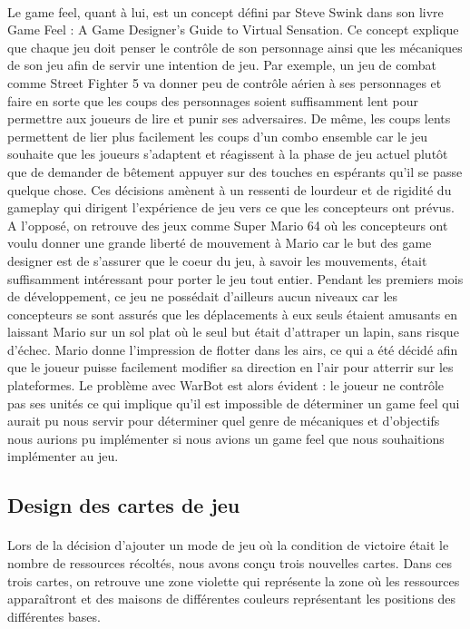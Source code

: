 \documentclass{report}
\begin{document}
\paragraph{}


  Le game feel, quant à lui, est un concept défini par Steve Swink dans son livre Game Feel : A Game Designer’s Guide to Virtual Sensation. Ce concept explique que chaque jeu doit penser le contrôle de son personnage ainsi que les mécaniques de son jeu afin de servir une intention de jeu. Par exemple, un jeu de combat comme Street Fighter 5 va donner peu de contrôle aérien à ses personnages et faire en sorte que les coups des personnages soient suffisamment lent pour permettre aux joueurs de lire et punir ses adversaires. De même, les coups lents permettent de lier plus facilement les coups d’un combo ensemble car le jeu souhaite que les joueurs s’adaptent et réagissent à la phase de jeu actuel plutôt que de demander de bêtement appuyer sur des touches en espérants qu’il se passe quelque chose. Ces décisions amènent à un ressenti de lourdeur et de rigidité du gameplay qui dirigent l’expérience de jeu vers ce que les concepteurs ont prévus. \newline
A l’opposé, on retrouve des jeux comme Super Mario 64 où les concepteurs ont voulu donner une grande liberté de mouvement à Mario car le but des game designer est de s’assurer que le coeur du jeu, à savoir les mouvements, était suffisamment intéressant pour porter le jeu tout entier. Pendant les premiers mois de développement, ce jeu ne possédait d’ailleurs aucun niveaux car les concepteurs se sont assurés que les déplacements à eux seuls étaient amusants en laissant Mario sur un sol plat où le seul but était d’attraper un lapin, sans risque d’échec. Mario donne l’impression de flotter dans les airs, ce qui a été décidé afin que le joueur puisse facilement modifier sa direction en l’air pour atterrir sur les plateformes. \newline
Le problème avec WarBot est alors évident : le joueur ne contrôle pas ses unités ce qui implique qu’il est impossible de déterminer un game feel qui aurait pu nous servir pour déterminer quel genre de mécaniques et d’objectifs nous aurions pu implémenter si nous avions un game feel que nous souhaitions implémenter au jeu.
\newpage
\subsection{Design des cartes de jeu}
\paragraph{}
  Lors de la décision d’ajouter un mode de jeu où la condition de victoire était le nombre de ressources récoltés, nous avons conçu trois nouvelles cartes. Dans ces trois cartes, on retrouve une zone violette qui représente la zone où les ressources apparaîtront et des maisons de différentes couleurs représentant les positions des différentes bases.
\end{document}
